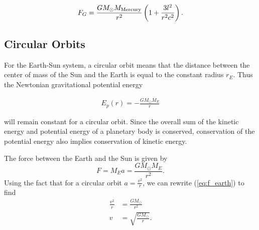 \documentclass[../main.tex]{subfiles}
\begin{document}
\begin{align}
    F_G = \frac{G M_\odot M_{\textnormal{Mercury}}}{r^2} \left(1 + \frac{3l^2}{r^2 c^2} \right).
\end{align}

\subsection{Circular Orbits}

For the Earth-Sun system, a circular orbit means that the distance between the center of mass of the Sun and the Earth is equal to the constant radius $r_E$. Thus the Newtonian gravitational potential energy

\begin{align}
    E_p(r) = -\frac{G M_\odot M_E}{r}
\end{align}

will remain constant for a circular orbit. Since the overall sum of the kinetic energy and potential energy of a planetary body is conserved, conservation of the potential energy also implies conservation of kinetic energy.

The force between the Earth and the Sun is given by
\begin{equation}\label{eq:f_earth}
    F = M_E a = \frac{GM_\odot M_E}{r^2}.
\end{equation}
Using the fact that for a circular orbit $a = \frac{v^2}{r}$, we can rewrite (\ref{eq:f_earth}) to find
\begin{align}
    \frac{v^2}{r} &= \frac{GM_\odot}{r^2}\\
    v &= \sqrt{\frac{GM_\odot}{r}}.
\end{align}
\end{document}
